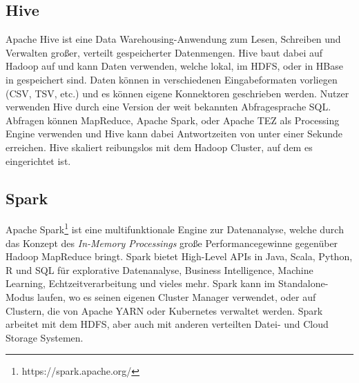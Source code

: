 \subsection{Hive}
Apache Hive ist eine Data Warehousing-Anwendung zum Lesen, Schreiben und Verwalten großer, verteilt gespeicherter Datenmengen. Hive baut dabei auf Hadoop auf und kann Daten verwenden, welche lokal, im HDFS, oder in HBase in gespeichert sind. Daten können in verschiedenen Eingabeformaten vorliegen (CSV, TSV, etc.) und es können eigene Konnektoren geschrieben werden. Nutzer verwenden Hive durch eine Version der weit bekannten Abfragesprache SQL. Abfragen können MapReduce, Apache Spark, oder Apache TEZ als Processing Engine verwenden und Hive kann dabei Antwortzeiten von unter einer Sekunde erreichen. Hive skaliert reibungslos mit dem Hadoop Cluster, auf dem es eingerichtet ist.\parencite{noauthor_apache_2020}
\subsection{Spark}
Apache Spark\footnote{https://spark.apache.org/} ist eine multifunktionale Engine zur Datenanalyse, welche durch das Konzept des \textit{In-Memory Processings} große Performancegewinne gegenüber Hadoop MapReduce bringt. Spark bietet High-Level APIs in Java, Scala, Python, R und SQL für explorative Datenanalyse, Business Intelligence, Machine Learning, Echtzeitverarbeitung und vieles mehr. Spark kann im Standalone-Modus laufen, wo es seinen eigenen Cluster Manager verwendet, oder auf Clustern, die von Apache YARN oder Kubernetes verwaltet werden. Spark arbeitet mit dem HDFS, aber auch mit anderen verteilten Datei- und Cloud Storage Systemen. 